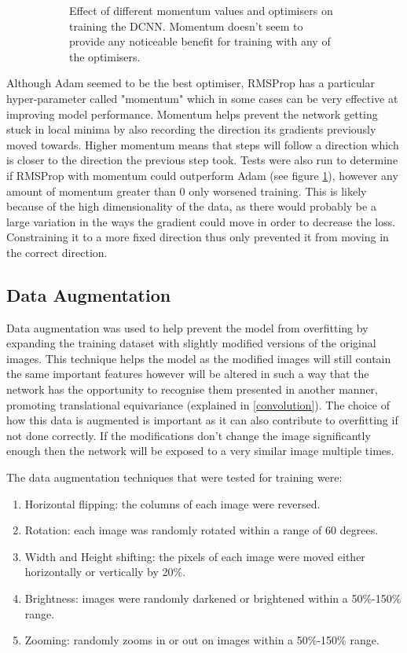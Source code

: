 \documentclass{l4proj}
\begin{document}
\begin{figure}[H]
\begin{subfigure}[t]{0.48\textwidth}
        \caption{Effect of different momentum values and optimisers on training the DCNN. Momentum doesn't seem to provide any noticeable benefit for training with any of the optimisers.}
        \label{fig:momentum}
    \end{subfigure} 
    \caption{}
    \label{fig:hyperparameters}
\end{figure}

Although Adam seemed to be the best optimiser, RMSProp has a particular hyper-parameter called "momentum" which in some cases can be very effective at improving model performance. Momentum helps prevent the network getting stuck in local minima by also recording the direction its gradients previously moved towards. Higher momentum means that steps will follow a direction which is closer to the direction the previous step took. Tests were also run to determine if RMSProp with momentum could outperform Adam (see figure \ref{fig:momentum}), however any amount of momentum greater than 0 only worsened training. This is likely because of the high dimensionality of the data, as there would probably be a large variation in the ways the gradient could move in order to decrease the loss. Constraining it to a more fixed direction thus only prevented it from moving in the correct direction.

\subsection{Data Augmentation}
Data augmentation was used to help prevent the model from overfitting by expanding the training dataset with slightly modified versions of the original images. This technique helps the model as the modified images will still contain the same important features however will be altered in such a way that the network has the opportunity to recognise them presented in another manner, promoting translational equivariance (explained in \ref{convolution}). The choice of how this data is augmented is important as it can also contribute to overfitting if not done correctly. If the modifications don't change the image significantly enough then the network will be exposed to a very similar image multiple times. 

The data augmentation techniques that were tested for training were:
\begin{enumerate}
    \item Horizontal flipping: the columns of each image were reversed.
    \item Rotation: each image was randomly rotated within a range of 60 degrees.
    \item Width and Height shifting: the pixels of each image were moved either horizontally or vertically by 20\%.
    \item Brightness: images were randomly darkened or brightened within a 50\%-150\% range.
    \item Zooming: randomly zooms in or out on images within a 50\%-150\% range.
\end{enumerate}
\end{document}
